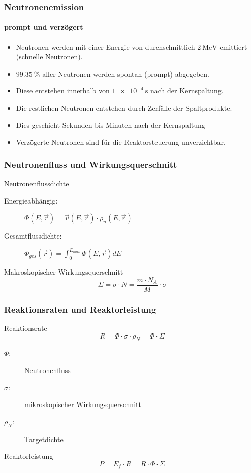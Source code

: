 \documentclass{beamer}[9pt]
\begin{document}
\begin{frame}
\frametitle{Neutronenemission}
\framesubtitle{prompt und verzögert}
\begin{itemize}
\item Neutronen werden mit einer Energie von durchschnittlich $\SI{2}{\MeV}$ emittiert (schnelle Neutronen).
\item $\SI{99.35}{\percent}$ aller Neutronen werden spontan (prompt) abgegeben.
\item Diese entstehen innerhalb von $\SI{1e-4}{\second}$   nach der Kernspaltung.
\item Die restlichen Neutronen entstehen durch Zerfälle der Spaltprodukte.
\item Dies geschieht Sekunden bis Minuten nach der Kernspaltung
\item Verzögerte Neutronen sind für die Reaktorsteuerung unverzichtbar.
\end{itemize}
\end{frame}




\begin{frame}
\frametitle{Neutronenfluss und Wirkungsquerschnitt}
\begin{block}{Neutronenflussdichte}
\begin{description}
\item[Energieabhängig:]$\Phi(E,\vec r) = \vec v(E,\vec r)\cdot \rho_n(E,\vec r)$
\item[Gesamtflussdichte:] $\Phi_{ges}(\vec r)= \int_0^{E_{max}}\Phi(E, \vec r) dE$
\end{description}

\end{block}

\begin{block}{Makroskopischer Wirkungsquerschnitt}
\[
\Sigma = \sigma \cdot N = \frac{m\cdot N_A}{M}\cdot \sigma
\]
\end{block}
\end{frame}

\begin{frame}
\frametitle{Reaktionsraten und Reaktorleistung}



\begin{block}{Reaktionsrate}
\[
R = \Phi \cdot \sigma \cdot \rho_N = \Phi \cdot \Sigma 
\]
\begin{description}
\item[$\Phi$:] Neutronenfluss
\item[$\sigma$:] mikroskopischer Wirkungsquerschnitt
\item[$\rho_N$:] Targetdichte

\end{description}
\end{block}

\begin{block}{Reaktorleistung}
\[
P = E_f \cdot R = R \cdot \Phi \cdot \Sigma
\]
\end{block}

\end{frame}
\end{document}
